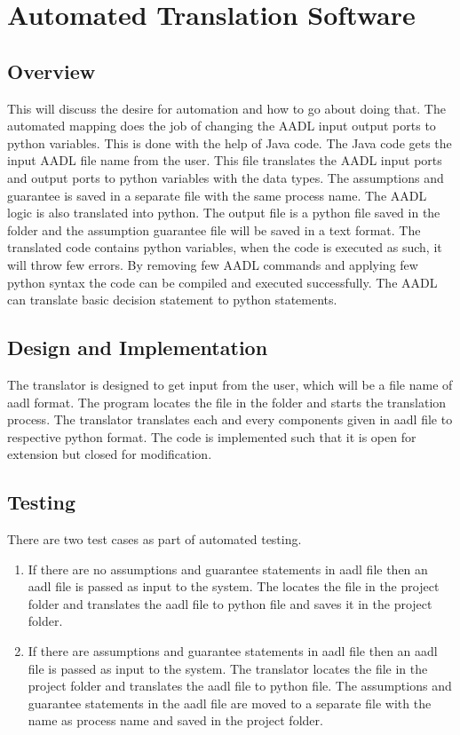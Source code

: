\documentclass[12pt]{report}
\theoremstyle{plain}
\theoremstyle{definition}
\begin{document}
\chapter*{Automated Translation Software}
\section*{Overview}
This will discuss the desire for automation and how to go about doing that.
The automated mapping does the job of changing the AADL input output ports to python variables. This is done with the help of Java code. The Java code gets the input AADL file name from the user. This file translates the AADL input ports and output ports to python variables with the data types. The assumptions and guarantee is saved in a separate file with the same process name. The AADL logic is also translated into python. The output file is a python file saved in the folder and the assumption guarantee file will be saved in a text format. The translated code contains python variables, when the code is executed as such, it will throw few errors. By removing few AADL commands and applying few python syntax the code can be compiled and executed successfully. The AADL can translate basic decision statement to python statements.


\section*{Design and Implementation}
The translator is designed to get input from the user, which will be a file name of aadl format. The program locates the file in the folder and starts the translation process. The translator translates each and every components given in aadl file to respective python format. The code is implemented such that it is open for extension but closed for modification. 


\section*{Testing}
There are two test cases as part of automated testing.
\begin{enumerate}
\item If there are no assumptions and guarantee statements in aadl file then  an aadl file is passed as input to the system. The locates the file in the project folder and translates the aadl file to python file and saves it in the project folder.
\item If there are assumptions and guarantee statements in aadl file then an aadl file is passed as input to the system. The translator locates the file in the project folder and translates the aadl file to python file. The  assumptions and guarantee statements in the aadl file are moved to a separate file with the name as process name and saved in the project folder.
\end{enumerate}
\end{document}
